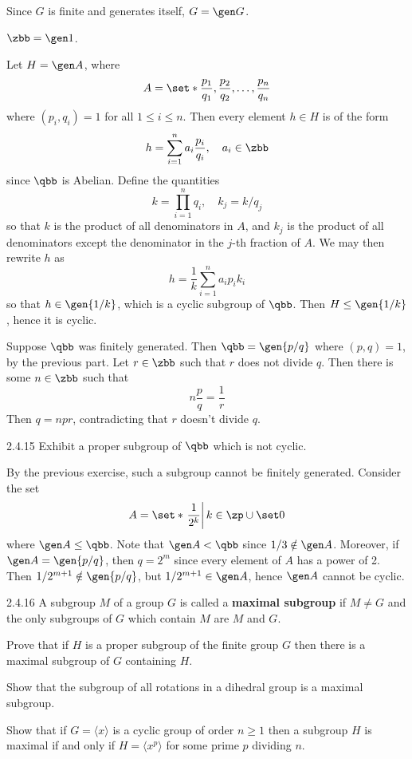\begin{solenum}[spsol]
    \item Since $G$ is finite and generates itself, $G = \gen G$. 
    \item $\zbb = \gen 1$.
    \item Let $H = \gen A$, where
    \[
    	A = \set*{\frac{p_1}{q_1}, \frac{p_2}{q_2}, \ldots, \frac{p_n}{q_n}}
    \]
    where $(p_i, q_i) = 1$ for all $1 \leq i \leq n$.
	Then every element $h \in H$ is of the form
    \[
    	h = \sum_{i = 1}^n a_i\frac{p_i}{q_i}, \quad a_i \in \zbb
    \]
    since $\qbb$ is Abelian.
	Define the quantities
    \[
    	k = \prod_{i = 1}^n q_i, \quad k_j = k/q_j
    \]
    so that $k$ is the product of all denominators in $A$, and $k_j$ is the product of all denominators except the denominator in the $j$-th fraction of $A$.
	We may then rewrite $h$ as
    \[
    	h = \frac 1k \sum_{i = 1}^n a_ip_ik_i
    \]
    so that $h \in \gen{1/k}$, which is a cyclic subgroup of $\qbb$.
	Then $H \leq \gen{1/k}$, hence it is cyclic.
    \item Suppose $\qbb$ was finitely generated.
	Then $\qbb = \gen{p/q}$ where $(p, q) = 1$, by the previous part.
	Let $r \in \zbb$ such that $r$ does not divide $q$.
	Then there is some $n \in \zbb$ such that
    \[
    	n \frac pq = \frac 1r
    \]
    Then $q = npr$, contradicting that $r$ doesn't divide $q$.
\end{solenum}

\begin{exercise}{2.4.15}
    Exhibit a proper subgroup of $\qbb$ which is not cyclic.
\end{exercise}

\begin{sol}
    By the previous exercise, such a subgroup cannot be finitely generated.
	Consider the set
    \[
    	A = \set*{\left. \frac 1{2^k} \right| k \in \zp \cup \set 0}
    \]
    where $\gen A \leq \qbb$.
	Note that $\gen A < \qbb$ since $1/3 \notin \gen A$.
	Moreover, if $\gen A = \gen{p/q}$, then $q = 2^m$ since every element of $A$ has a power of 2.
	Then $1/2^{m + 1} \notin \gen{p/q}$, but $1/2^{m + 1} \in \gen A$, hence $\gen A$ cannot be cyclic.
\end{sol}

\begin{spex}{2.4.16}
    A subgroup $M$ of a group $G$ is called a \textbf{maximal subgroup} if $M\ne G$ and the only subgroups of $G$ which contain $M$ are $M$ and $G$.
    \begin{subexercises}
        \item Prove that if $H$ is a proper subgroup of the finite group $G$ then there is a maximal subgroup of $G$ containing $H$.
        \item Show that the subgroup of all rotations in a dihedral group is a maximal subgroup.
        \item Show that if $G=\langle x\rangle$ is a cyclic group of order $n\ge 1$ then a subgroup $H$ is maximal if and only if $H=\langle x^p\rangle$ for some prime $p$ dividing $n$.
    \end{subexercises}
\end{spex}

